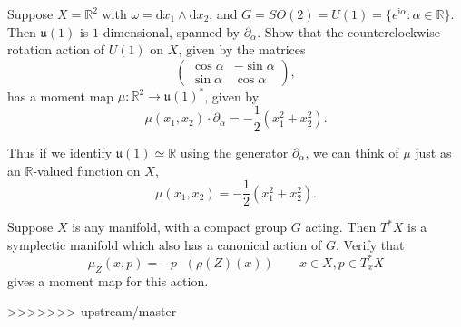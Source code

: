 \documentclass[12pt,letterpaper,reqno]{article}
\numberwithin{equation}{section}
\newcommand{\fu}{{\mathfrak u}}
\newcommand{\R}{\ensuremath{\mathbb R}}
\newcommand{\half}{\ensuremath{\frac{1}{2}}}
\newcommand{\I}{{\mathrm i}}
\newcommand{\de}{\mathrm{d}}
\begin{document}
\begin{exercise}
Suppose $X = \R^2$ with $\omega = \de x_1 \wedge \de x_2$, and
$G = SO(2) = U(1) = \{e^{\I \alpha}: \alpha \in \R \}$.
Then $\fu(1)$ is $1$-dimensional, spanned by $\partial_\alpha$.
Show that the counterclockwise rotation action of $U(1)$ on $X$,
given by the matrices
\begin{equation}
   \begin{pmatrix} \cos \alpha & - \sin \alpha \\ \sin \alpha & \cos \alpha \end{pmatrix},
 \end{equation}
has a moment map $\mu: \R^2 \to \fu(1)^*$, given by
\begin{equation}
  \mu(x_1,x_2) \cdot \partial_\alpha = -\half (x_1^2 + x_2^2).
\end{equation}
\end{exercise}
Thus if we identify $\fu(1) \simeq \R$ using the generator
$\partial_\alpha$, we can think of $\mu$ just as an $\R$-valued function
on $X$,
\begin{equation}
  \mu(x_1,x_2) = -\half (x_1^2 + x_2^2).
\end{equation}

\begin{exercise} \label{exc:cotangent-moment-map}
Suppose $X$ is any manifold, with a compact
group $G$ acting. Then $T^* X$ is a symplectic manifold
which also has a canonical action of $G$. Verify that
\begin{equation}
  \mu_Z(x,p) = -p \cdot (\rho(Z)(x)) \qquad x \in X, p \in T^*_x X
\end{equation}
gives a moment map for this action.
\end{exercise}

>>>>>>> upstream/master

\printbibliography
\end{document}
